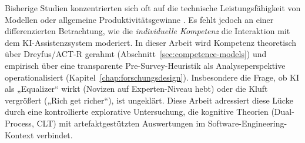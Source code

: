 Bisherige Studien konzentrierten sich oft auf die technische Leistungsfähigkeit von Modellen oder allgemeine Produktivitätsgewinne \parencite{peng2023copilot}. Es fehlt jedoch an einer differenzierten Betrachtung, wie die \emph{individuelle Kompetenz} die Interaktion mit dem KI-Assistenzsystem moderiert. In dieser Arbeit wird Kompetenz theoretisch über Dreyfus/ACT-R gerahmt (Abschnitt~\ref{sec:competence-models}) und empirisch über eine transparente Pre-Survey-Heuristik als Analyseperspektive operationalisiert (Kapitel~\ref{chap:forschungsdesign}). Insbesondere die Frage, ob KI als „Equalizer“ wirkt (Novizen auf Experten-Niveau hebt) oder die Kluft vergrößert („Rich get richer“), ist ungeklärt. Diese Arbeit adressiert diese Lücke durch eine kontrollierte explorative Untersuchung, die kognitive Theorien (Dual-Process, CLT) mit artefaktgestützten Auswertungen im Software-Engineering-Kontext verbindet.

